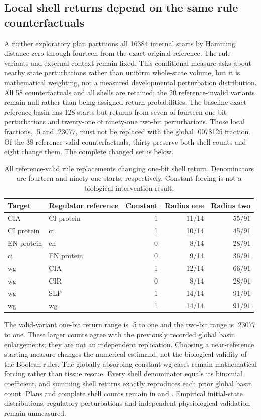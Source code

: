 \subsection{Local shell returns depend on the same rule counterfactuals}
A further exploratory plan partitions all 16384 internal starts by Hamming distance zero through fourteen from the exact original reference. The rule variants and external context remain fixed. This conditional measure asks about nearby state perturbations rather than uniform whole-state volume, but it is mathematical weighting, not a measured developmental perturbation distribution. All 58 counterfactuals and all shells are retained; the 20 reference-invalid variants remain null rather than being assigned return probabilities.
The baseline exact-reference basin has 128 starts but returns from seven of fourteen one-bit perturbations and twenty-one of ninety-one two-bit perturbations. Those local fractions, .5 and .23077, must not be replaced with the global .0078125 fraction. Of the 38 reference-valid counterfactuals, thirty preserve both shell counts and eight change them. The complete changed set is below.
\begin{table}[ht]\centering
\caption{All reference-valid rule replacements changing one-bit shell return. Denominators are fourteen and ninety-one starts, respectively. Constant forcing is not a biological intervention result.}
\begin{tabular}{llrrr}\hline
Target & Regulator reference & Constant & Radius one & Radius two\\\hline
CIA & CI protein & 1 &11/14&55/91\\
CI protein & ci & 1 &10/14&45/91\\
EN protein & en & 0 &8/14&28/91\\
ci & EN protein & 0 &9/14&36/91\\
wg & CIA & 1 &12/14&66/91\\
wg & CIR & 0 &8/14&28/91\\
wg & SLP & 1 &14/14&91/91\\
wg & wg & 1 &14/14&91/91\\\hline
\end{tabular}\end{table}


The valid-variant one-bit return range is .5 to one and the two-bit range is .23077 to one. These larger counts agree with the previously recorded global basin enlargements; they are not an independent replication. Choosing a near-reference starting measure changes the numerical estimand, not the biological validity of the Boolean rules. The globally absorbing constant-wg cases remain mathematical forcing rather than tissue rescue. Every shell denominator equals its binomial coefficient, and summing shell returns exactly reproduces each prior global basin count. Plans and complete shell counts remain in  and . Empirical initial-state distributions, regulatory perturbations and independent physiological validation remain unmeasured.

